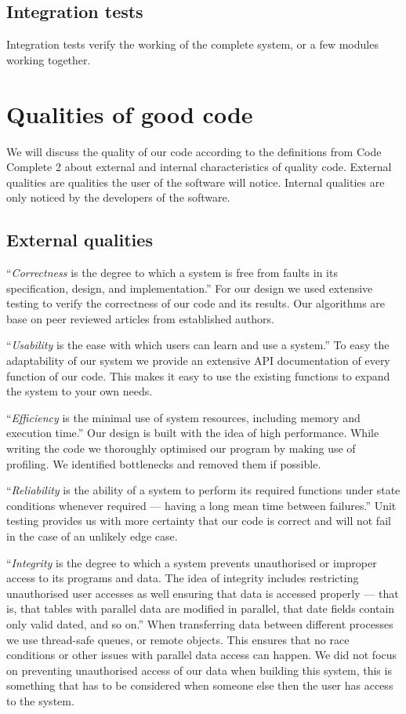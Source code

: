 \documentclass[a4paper, openany, oneside]{memoir}
\begin{document}
\subsection{Integration tests}
Integration tests verify the working of the complete system, or a few modules working together.

\section{Qualities of good code}
We will discuss the quality of our code according to the definitions from Code Complete 2 about external and internal characteristics of quality code. External qualities are qualities the user of the software will notice. Internal qualities are only noticed by the developers of the software.\cite{mcconnell2004code}

\subsection{External qualities}
``\textit{Correctness} is the degree to which a system is free from faults in its specification, design, and implementation.'' For our design we used extensive testing to verify the correctness of our code and its results. Our algorithms are base on peer reviewed articles from established authors.

``\textit{Usability} is the ease with which users can learn and use a system.'' To easy the adaptability of our system we provide an extensive API documentation of every function of our code. This makes it easy to use the existing functions to expand the system to your own needs.

``\textit{Efficiency} is the minimal use of system resources, including memory and execution time.'' Our design is built with the idea of high performance. While writing the code we thoroughly optimised our program by making use of profiling. We identified bottlenecks and removed them if possible.

``\textit{Reliability} is the ability of a system to perform its required functions under state conditions whenever required --- having a long mean time between failures.'' Unit testing provides us with more certainty that our code is correct and will not fail in the case of an unlikely edge case.

``\textit{Integrity} is the degree to which a system prevents unauthorised or improper access to its programs and data. The idea of integrity includes restricting unauthorised user accesses as well ensuring that data is accessed properly --- that is, that tables with parallel data are modified in parallel, that date fields contain only valid dated, and so on.'' When transferring data between different processes we use thread-safe queues, or remote objects. This ensures that no race conditions or other issues with parallel data access can happen. We did not focus on preventing unauthorised access of our data when building this system, this is something that has to be considered when someone else then the user has access to the system.
\end{document}

